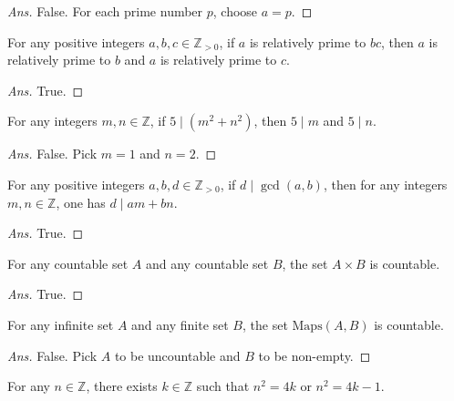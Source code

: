 \documentclass[12pt]{article}
\newenvironment{problem}[2][Problem]{\begin{trivlist}
\item[\hskip \labelsep {\bfseries #1}\hskip \labelsep {\bfseries #2.}]}{\end{trivlist}}
\begin{document}
\begin{proof}[Ans]
False. For each prime number $p$, choose $a = p$.
\end{proof}

\begin{problem}{27}
For any positive integers $a, b, c \in \mathbb{Z}_{>0}$, if $a$ is relatively prime to $bc$,
then $a$ is relatively prime to $b$ and $a$ is relatively prime to $c$.

\end{problem}

\begin{proof}[Ans]
True.
\end{proof}

\begin{problem}{28}
For any integers $m, n \in \mathbb{Z}$, if $5 \mid (m^2+n^2)$, then $5 \mid m$ and $5 \mid n$.

\end{problem}

\begin{proof}[Ans]
False. Pick $m = 1$ and $n = 2$.
\end{proof}

\begin{problem}{29}
For any positive integers $a, b, d \in \mathbb{Z}_{>0}$,
if $d \mid \gcd(a, b)$, then for any integers $m, n \in \mathbb{Z}$, one has $d \mid am+bn$.
\end{problem}

\begin{proof}[Ans]
True.
\end{proof}

\begin{problem}{30}
For any countable set $A$ and any countable set $B$,
the set $A \times B$ is countable.
\end{problem}

\begin{proof}[Ans]
True.
\end{proof}

\begin{problem}{31}
For any infinite set $A$ and any finite set $B$, the set $\text{Maps}(A, B)$ is countable.
\end{problem}

\begin{proof}[Ans]
False. Pick $A$ to be uncountable and $B$ to be non-empty.
\end{proof}

\begin{problem}{32}
For any $n \in \mathbb{Z}$, there exists $ k \in \mathbb{Z}$ such that $n^2=4k$ or $n^2=4k-1$.
\end{problem}
\end{document}
